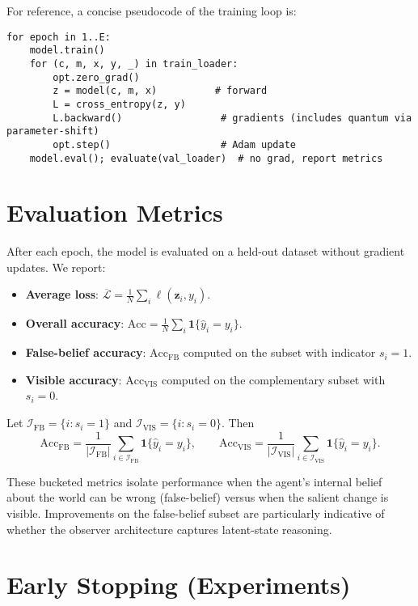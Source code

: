 \documentclass[11pt]{article}
\begin{document}
For reference, a concise pseudocode of the training loop is:
\begin{verbatim}
for epoch in 1..E:
    model.train()
    for (c, m, x, y, _) in train_loader:
        opt.zero_grad()
        z = model(c, m, x)          # forward
        L = cross_entropy(z, y)
        L.backward()                 # gradients (includes quantum via parameter-shift)
        opt.step()                   # Adam update
    model.eval(); evaluate(val_loader)  # no grad, report metrics
\end{verbatim}

\section{Evaluation Metrics}

After each epoch, the model is evaluated on a held-out dataset without gradient updates. We report:
\begin{itemize}
  \item \textbf{Average loss}: $\overline{\mathcal{L}}=\tfrac{1}{N}\sum_i \ell(\bm{z}_i, y_i)$.
  \item \textbf{Overall accuracy}: $\mathrm{Acc}=\tfrac{1}{N}\sum_i \mathbf{1}\{\hat{y}_i=y_i\}$.
  \item \textbf{False-belief accuracy}: $\mathrm{Acc}_{\mathrm{FB}}$ computed on the subset with indicator $s_i=1$.
  \item \textbf{Visible accuracy}: $\mathrm{Acc}_{\mathrm{VIS}}$ computed on the complementary subset with $s_i=0$.
\end{itemize}
Let $\mathcal{I}_{\mathrm{FB}}=\{i: s_i=1\}$ and $\mathcal{I}_{\mathrm{VIS}}=\{i: s_i=0\}$. Then
\begin{equation}
  \mathrm{Acc}_{\mathrm{FB}} = \frac{1}{|\mathcal{I}_{\mathrm{FB}}|} \sum_{i\in\mathcal{I}_{\mathrm{FB}}} \mathbf{1}\{\hat{y}_i=y_i\},
  \qquad
  \mathrm{Acc}_{\mathrm{VIS}} = \frac{1}{|\mathcal{I}_{\mathrm{VIS}}|} \sum_{i\in\mathcal{I}_{\mathrm{VIS}}} \mathbf{1}\{\hat{y}_i=y_i\}.
\end{equation}

These bucketed metrics isolate performance when the agent’s internal belief about the world can be wrong (false-belief) versus when the salient change is visible. Improvements on the false-belief subset are particularly indicative of whether the observer architecture captures latent-state reasoning.

\section{Early Stopping (Experiments)}
\end{document}
